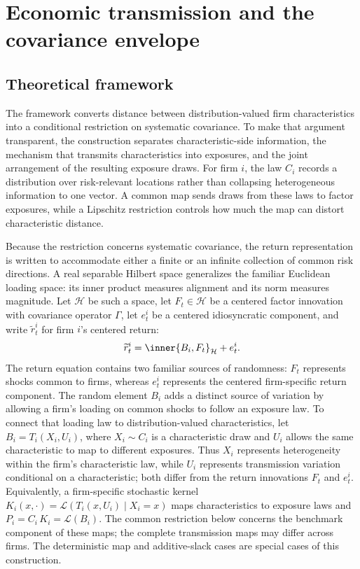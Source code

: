 \section{Economic transmission and the covariance envelope}\label{sec:methodology}

\subsection{Theoretical framework}

The framework converts distance between distribution-valued firm
characteristics into a conditional restriction on systematic covariance.
To make that argument transparent, the construction separates
characteristic-side information, the mechanism that transmits characteristics
into exposures, and the joint arrangement of the resulting exposure draws.
For firm $i$, the law $C_i$ records a distribution over risk-relevant
locations rather than collapsing heterogeneous information to one vector.
A common map sends draws from these laws to factor exposures, while a
Lipschitz restriction controls how much the map can distort characteristic distance.

Because the restriction concerns systematic covariance, the return
representation is written to accommodate either a finite or an infinite
collection of common risk directions.
A real separable Hilbert space generalizes the familiar Euclidean loading
space: its inner product measures alignment and its norm measures magnitude.
Let $\mathcal H$ be such a space, let $F_t\in\mathcal H$ be a centered factor
innovation with covariance operator $\Gamma$, let $e_t^i$ be a centered
idiosyncratic component, and write $\widetilde r_t^i$ for firm $i$'s centered return:
\begin{equation}\label{eq:hilbert-return}
  \widetilde r_t^i = \inner{B_i,F_t}_{\mathcal H}+e_t^i.
\end{equation}
The return equation contains two familiar sources of randomness: $F_t$
represents shocks common to firms, whereas $e_t^i$ represents the centered
firm-specific return component.
The random element $B_i$ adds a distinct source of variation by allowing a
firm's loading on common shocks to follow an exposure law.
To connect that loading law to distribution-valued characteristics, let
$B_i=T_i(X_i,U_i)$, where $X_i\sim C_i$ is a characteristic draw and $U_i$
allows the same characteristic to map to different exposures.
Thus $X_i$ represents heterogeneity within the firm's characteristic law,
while $U_i$ represents transmission variation conditional on a
characteristic; both differ from the return innovations $F_t$ and $e_t^i$.
Equivalently, a firm-specific stochastic kernel
$K_i(x,\cdot)=\mathcal L(T_i(x,U_i)\mid X_i=x)$ maps
characteristics to exposure laws and $P_i=C_i\,K_i=\mathcal L(B_i)$.
The common restriction below concerns the benchmark component of these maps;
the complete transmission maps may differ across firms.
The deterministic map and additive-slack cases are special cases of this construction.


